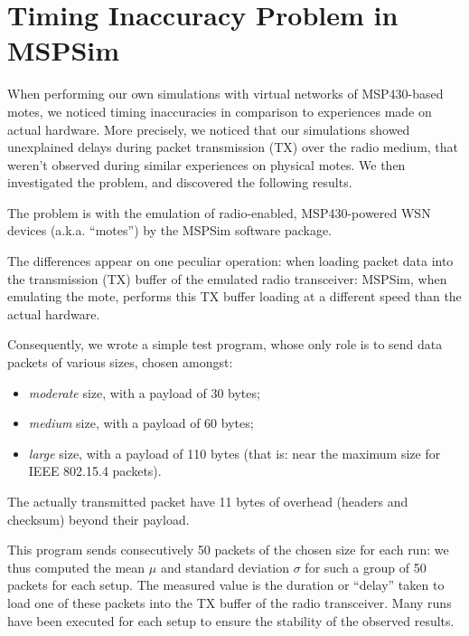\documentclass[10pt,final,journal,twocolumn]{IEEEtran}
\begin{document}

\section{Timing Inaccuracy Problem in MSPSim}
\label{results}

When performing our own simulations with virtual networks of MSP430-based
motes, we noticed timing inaccuracies in comparison to experiences made
on actual hardware. More precisely, we noticed that our simulations showed
unexplained delays during packet transmission (TX) over the radio medium,
that weren't observed during similar experiences on physical motes.
We then investigated the problem, and discovered the following results.

The problem is with the emulation of radio-enabled, MSP430-powered WSN
devices (a.k.a. ``motes'') by the MSPSim software package.

The differences appear on one peculiar operation: when loading packet data
into the transmission (TX) buffer of the emulated radio transceiver:
MSPSim, when emulating the mote, performs this TX buffer loading at
a different speed than the actual hardware.

Consequently, we wrote a simple test program, whose only role is to send
data packets of various sizes, chosen amongst:
\begin{itemize}
\item \emph{moderate} size, with a payload of 30 bytes;
\item \emph{medium} size, with a payload of 60 bytes;
\item \emph{large} size, with a payload of 110 bytes (that is:
      near the maximum size for IEEE 802.15.4 packets\footnotemark[1]).
\end{itemize}
The actually transmitted packet have 11 bytes of overhead (headers and
checksum) beyond their payload.

This program sends consecutively 50 packets of the chosen size for each run:
we thus computed the mean $\mu$ and standard deviation $\sigma$ for such
a group of 50 packets for each setup. The measured value is the duration
or ``delay'' taken to load one of these packets into the TX buffer of
the radio transceiver. Many runs have been executed for each setup
to ensure the stability of the observed results.
\end{document}
